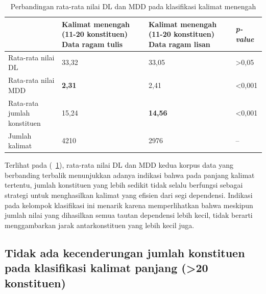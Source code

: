 \begin{table}
\begin{center}
\begin{small}
 \caption{Perbandingan rata-rata nilai DL dan MDD pada klasifikasi kalimat menengah}\label{tab:DL_MDD_menengah}  
 \begin{tabular}{| p{3.2cm} | p{3.2cm} | p{3.2cm} | p{2cm} |}
    \hline
 & Kalimat menengah \newline (11-20 konstituen) \newline Data ragam tulis & Kalimat menengah \newline (11-20 konstituen) \newline Data ragam lisan & \textit{p-value} \\ \hline
 Rata-rata nilai DL & 33,32 & 33,05 & \textgreater 0,05  \\ \hline
 Rata-rata nilai MDD & \textbf{2,31} & 2,41 & \textless 0,001 \\ \hline
 Rata-rata jumlah konstituen & 15,24 & \textbf{14,56} & \textless 0,001 \\ \hline
 Jumlah kalimat & 4210 & 2976 & -- \\ \hline
   \end{tabular}
   \end{small}
\end{center}
\end{table}


Terlihat pada (\tab~\ref{tab:DL_MDD_menengah}), rata-rata nilai DL dan MDD kedua korpus data yang berbanding terbalik menunjukkan adanya indikasi bahwa pada panjang kalimat tertentu, jumlah konstituen yang lebih sedikit tidak selalu berfungsi sebagai strategi untuk menghasilkan kalimat yang efisien dari segi dependensi. Indikasi pada kelompok klasifikasi ini menarik karena memperlihatkan bahwa meskipun jumlah nilai yang dihasilkan semua tautan dependensi lebih kecil, tidak berarti menggambarkan jarak antarkonstituen yang lebih kecil juga.

\subsection{Tidak ada kecenderungan jumlah konstituen pada klasifikasi kalimat panjang (\textgreater20 konstituen)}

